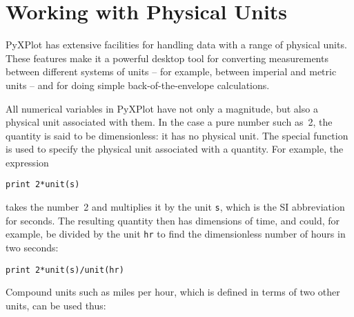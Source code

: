 \vspace{3mm}
\newline
{}\newline
{}\newline
{}\newline
{}\newline
{}\newline
{}\newline
{}
\vspace{3mm}

\section{Working with Physical Units}
\label{sec:units}

PyXPlot has extensive facilities for handling data with a range of physical
units. These features make it a powerful desktop tool for converting
measurements between different systems of units -- for example, between
imperial and metric units -- and for doing simple back-of-the-envelope
calculations.

All numerical variables in PyXPlot have not only a magnitude, but also a
physical unit associated with them. In the case a pure number such as~2, the
quantity is said to be dimensionless: it has no physical unit. The special
function  is used to specify the physical unit associated with a
quantity. For example, the expression

\begin{verbatim}
print 2*unit(s)
\end{verbatim}

\noindent takes the number~2 and multiplies it by the unit {\tt s}, which is
the SI abbreviation for seconds.  The resulting quantity then has dimensions of
time, and could, for example, be divided by the unit {\tt hr} to find the
dimensionless number of hours in two seconds:

\begin{verbatim}
print 2*unit(s)/unit(hr)
\end{verbatim}

Compound units such as miles per hour, which is defined in terms of two other
units, can be used thus:

